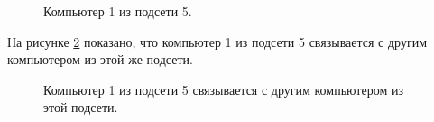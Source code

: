 \documentclass[a4paper,14pt]{article}
\begin{document}
\begin{figure}[!h]
    \caption{Компьютер 1 из подсети 5.}
    \label{fig:pc51}
\end{figure}

\newpage

На рисунке \ref{fig:pc51ping} показано, что компьютер 1 из подсети 5 связывается с другим компьютером из этой же подсети.

\begin{figure}[!h]
    \caption{Компьютер 1 из подсети 5 связывается с другим компьютером из этой подсети.}
    \label{fig:pc51ping}
\end{figure}
\end{document}
